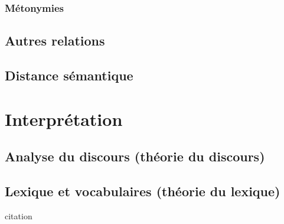\documentclass[a4paper,10pt]{article}
\begin{document}
		\subsubsection{Métonymies}
	\subsection{Autres relations}
	\subsection{Distance sémantique}

\section{Interprétation}
	\subsection{Analyse du discours (théorie du discours)}
	\subsection{Lexique et vocabulaires (théorie du lexique)}






\begin{center}
	\footnotesize
	\begin{minipage}{0.7\textwidth}
		citation
	\end{minipage}
\end{center}
\medskip




\end{document}
